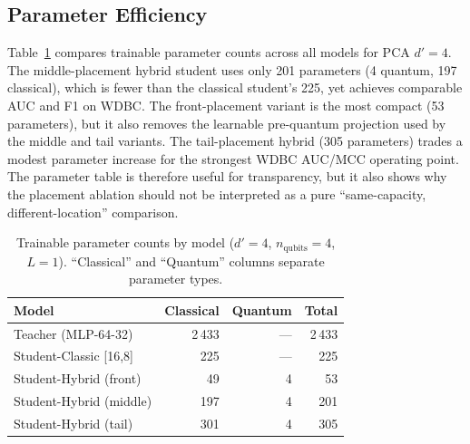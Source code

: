 \documentclass[11pt,a4paper]{article}
\begin{document}
\subsection{Parameter Efficiency}
\label{sec:param_efficiency}

Table~\ref{tab:params} compares trainable parameter counts across all models for PCA $d'=4$.
The middle-placement hybrid student uses only 201 parameters (4 quantum, 197 classical), which is
fewer than the classical student's 225, yet achieves comparable AUC and F1 on WDBC.
The front-placement variant is the most compact (53 parameters), but it also removes the learnable
pre-quantum projection used by the middle and tail variants. The tail-placement hybrid (305
parameters) trades a modest parameter increase for the strongest WDBC AUC/MCC operating point. The
parameter table is therefore useful for transparency, but it also shows why the placement ablation
should not be interpreted as a pure ``same-capacity, different-location'' comparison.

\begin{table}[t]
\caption{Trainable parameter counts by model ($d'=4$, $n_{\text{qubits}}{=}4$, $L{=}1$).
``Classical'' and ``Quantum'' columns separate parameter types.}
\label{tab:params}
\centering\small
\begin{tabular}{lrrr}
\toprule
Model & Classical & Quantum & Total \\
\midrule
Teacher (MLP-64-32)       & 2\,433 & --- & 2\,433 \\
Student-Classic [16,8]    &   225 & --- &   225 \\
Student-Hybrid (front)    &    49 &   4 &    53 \\
Student-Hybrid (middle)   &   197 &   4 &   201 \\
Student-Hybrid (tail)     &   301 &   4 &   305 \\
\bottomrule
\end{tabular}
\end{table}
\end{document}

